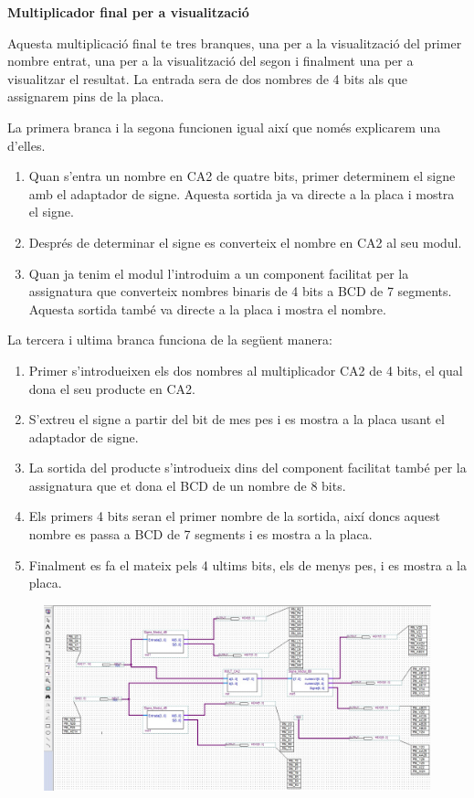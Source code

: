 \documentclass[12pt, a4papre]{article}
\begin{document}
	\textbf{\large{Multiplicador final per a visualització}}
	
	Aquesta multiplicació final te tres branques, una per a la visualització del primer nombre entrat, una per a la visualització del segon i finalment una per a visualitzar el resultat. La entrada sera de dos nombres de 4 bits als que assignarem pins de la placa. 
	
	La primera branca i la segona funcionen igual així que només explicarem una d'elles. 
	\begin{enumerate}
	\item Quan s'entra un nombre en CA2 de quatre bits, primer determinem el signe amb el adaptador de signe. Aquesta sortida ja va directe a la placa i mostra el signe.
	\item Després de determinar el signe es converteix el nombre en CA2 al seu modul.
	\item Quan ja tenim el modul l'introduim a un component facilitat per la assignatura que converteix nombres binaris de 4 bits a BCD de 7 segments. Aquesta sortida també va directe a la placa i mostra el nombre.
	\end{enumerate}
	
	La tercera i ultima branca funciona de la següent manera:
	\begin{enumerate}
	\item Primer s'introdueixen els dos nombres al multiplicador CA2 de 4 bits, el qual dona el seu producte en CA2.
	\item S'extreu el signe a partir del bit de mes pes i es mostra a la placa usant el adaptador de signe.
	\item La sortida del producte s'introdueix dins del component facilitat també per la assignatura que et dona el BCD de un nombre de 8 bits.
	\item Els primers 4 bits seran el primer nombre de la sortida, així doncs aquest nombre es passa a BCD de 7 segments i es mostra a la placa.
	\item Finalment es fa el mateix pels 4 ultims bits, els de menys pes, i es mostra a la placa.
	\end{enumerate}
	
	\begin{center}
	\begin{figure}[H]
		\begin{center}
		\includegraphics[width=150mm]{multFinal.jpeg}
		\end{center}
	\end{figure}
	
	\end{center}
	
\end{document}
